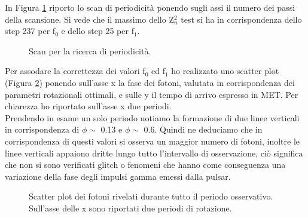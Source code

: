 \documentclass[a4paper,twocolumn]{article}
\begin{document}
\begin{large}
\noindent
In Figura \ref{scan} riporto lo scan di periodicità ponendo sugli assi il numero dei passi della scansione. Si vede che il massimo dello Z$^2_n$ test si ha in corrispondenza dello step 237 per f$_0$ e dello step 25 per f$_1$.

\begin{figure}[h]
    \caption{\small Scan per la ricerca di periodicità.}
    \label{scan}
\end{figure}

\noindent
Per assodare la correttezza dei valori f$_0$ ed f$_1$ ho realizzato uno scatter plot (Figura \ref{scatter}) ponendo sull'asse x la fase dei fotoni, valutata in corrispondenza dei parametri rotazionali ottimali, e sulle y il tempo di arrivo espresso in MET. Per chiarezza ho riportato sull'asse x due periodi.\\
Prendendo in esame un solo periodo notiamo la formazione di due linee verticali in corrispondenza di $\phi \sim$ 0.13 e $\phi \sim$ 0.6. Quindi ne deduciamo che in corrispondenza di questi valori si osserva un maggior numero di fotoni, inoltre le linee verticali appaiono dritte lungo tutto l'intervallo di osservazione, ciò significa che non si sono verificati glitch o fenomeni che hanno come conseguenza una variazione della fase degli impulsi gamma emessi dalla pulsar.


\begin{figure}[h]
    \caption{\small Scatter plot dei fotoni rivelati durante tutto il periodo osservativo. Sull'asse delle x sono riportati due periodi di rotazione.}
    \label{scatter}
\end{figure}


\end{large}
\end{document}
